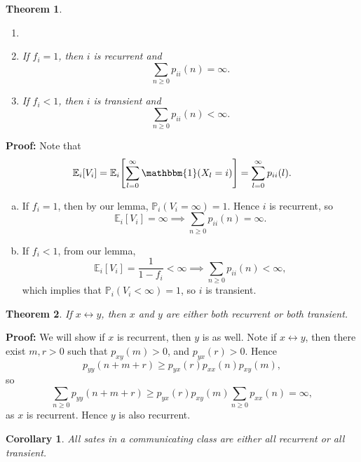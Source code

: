 \documentclass[12pt]{article}
\newtheorem{theorem}{Theorem}[section]
\newtheorem{corollary}{Corollary}[section]
\theoremstyle{definition}
\theoremstyle{remark}
\begin{document}
\newpage

\begin{theorem}
	\begin{enumerate}[\normalfont(a)]
		\item[]
		\item If $f_i = 1$, then $i$ is recurrent and
			\[
				\sum_{n \geq 0} p_{ii}(n) = \infty
			.\]
		\item If $f_i < 1$, then $i$ is transient and
			\[
				\sum_{n \geq 0} p_{ii}(n) < \infty
			.\]
	\end{enumerate}
\end{theorem}

\begin{adjustbox}{minipage = \columnwidth - 25.5pt, margin=1em, frame=1pt, margin=0em}
\textbf{Proof:} Note that
\[
	\mathbb{E}_i[V_i] = \mathbb{E}_i\Biggl[\sum_{l = 0}^{\infty} \mathbbm{1}(X_l = i) \Biggr] = \sum_{l = 0}^{\infty} p_{ii}(l)
.\]
\begin{enumerate}[(a)]
	\item If $f_i = 1$, then by our lemma, $\mathbb{P}_i(V_i = \infty) = 1$. Hence $i$ is recurrent, so
		\[
			\mathbb{E}_i[V_i] = \infty \implies \sum_{n \geq 0} p_{ii}(n) = \infty
		.\]
	\item If $f_i < 1$, from our lemma,
		\[
			\mathbb{E}_i[V_i] = \frac{1}{1 - f_i} < \infty \implies \sum_{n \geq 0} p_{ii}(n) < \infty
		,\]
		which implies that $\mathbb{P}_i(V_i < \infty) = 1$, so $i$ is transient.
\end{enumerate}
\end{adjustbox}

\begin{theorem}
	If $x \leftrightarrow y$, then $x$ and $y$ are either both recurrent or both transient.
\end{theorem}

\begin{adjustbox}{minipage = \columnwidth - 25.5pt, margin=1em, frame=1pt, margin=0em}
	\textbf{Proof:} We will show if $x$ is recurrent, then $y$ is as well. Note if $x \leftrightarrow y$, then there exist $m, r > 0$ such that $p_{xy}(m) > 0$, and $p_{yx}(r) > 0$. Hence
	\[
		p_{yy}(n + m + r) \geq p_{yx}(r)p_{xx}(n)p_{xy}(m),
	\]
	so
	\[
		\sum_{n \geq 0}p_{yy}(n+m+r) \geq p_{yx}(r)p_{xy}(m) \sum_{n \geq 0}p_{xx}(n) = \infty
	,\]
	as $x$ is recurrent. Hence $y$ is also recurrent.
\end{adjustbox}

\begin{corollary}
	All sates in a communicating class are either all recurrent or all transient.
\end{corollary}
\end{document}
